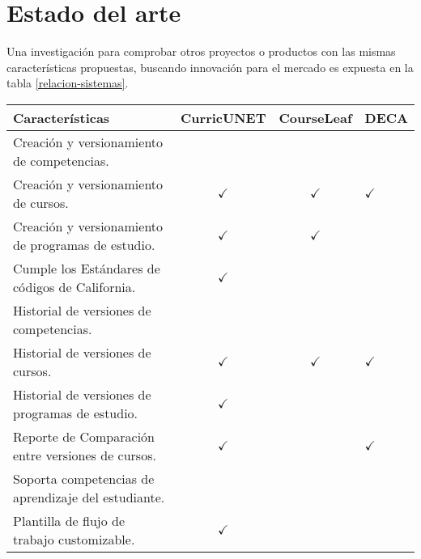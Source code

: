 \section{Estado del arte}
Una investigación para comprobar otros proyectos o productos con las mismas características propuestas, buscando innovación para el mercado es expuesta en la tabla \ref{relacion-sistemas}.

\begin{table}[H]
\centering
\begin{tabular}{lllccl}
\toprule
\multicolumn{3}{l}{Características}                                                & CurricUNET                       & CourseLeaf            & DECA         \\
\midrule
\multicolumn{3}{l}{Creación y versionamiento de competencias.}                     &                                  &                       &              \\
\multicolumn{3}{l}{Creación y versionamiento de cursos.}                           & $\checkmark$                     & $\checkmark$          & $\checkmark$ \\
\multicolumn{3}{l}{Creación y versionamiento de programas de estudio.}             & $\checkmark$                     & $\checkmark$          &              \\
\multicolumn{3}{l}{Cumple los Estándares de códigos de California.} 			   & $\checkmark$                     &                       &              \\
\multicolumn{3}{l}{Historial de versiones de competencias.}     			       & 			                      & 		              &  			 \\
\multicolumn{3}{l}{Historial de versiones de cursos.}     			               & $\checkmark$                     & $\checkmark$          & $\checkmark$ \\
\multicolumn{3}{l}{Historial de versiones de programas de estudio.}     		   & $\checkmark$                     &  			          & 			 \\
\multicolumn{3}{l}{Reporte de Comparación entre versiones de cursos.}              & $\checkmark$                     &                       & $\checkmark$ \\
\multicolumn{3}{l}{Soporta competencias de aprendizaje del estudiante.}            &                      			  &                       &              \\
\multicolumn{3}{l}{Plantilla de flujo de trabajo customizable.}                    & $\checkmark$                     &                       &              \\

\end{tabular}
\end{table}
